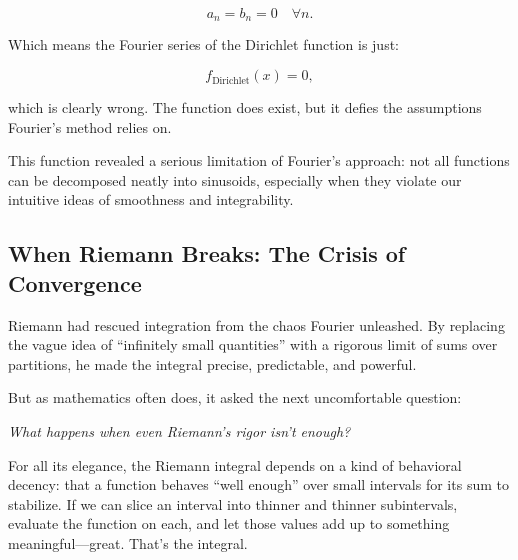 \[
a_n = b_n = 0 \quad \forall n.
\]

Which means the Fourier series of the Dirichlet function is just:

\[
f_{\text{Dirichlet}}(x) = 0,
\]

which is clearly wrong. The function does exist, but it defies the assumptions Fourier’s method relies on.

\begin{center}
\end{center}

\bigskip

This function revealed a serious limitation of Fourier’s approach: not all functions can be decomposed neatly into sinusoids, especially when they violate our intuitive ideas of smoothness and integrability.


\subsection{When Riemann Breaks: The Crisis of Convergence}

Riemann had rescued integration from the chaos Fourier unleashed. By replacing the vague idea of “infinitely small quantities” with a rigorous limit of sums over partitions, he made the integral precise, predictable, and powerful.

But as mathematics often does, it asked the next uncomfortable question:

\begin{center}
\emph{What happens when even Riemann's rigor isn't enough?}
\end{center}

For all its elegance, the Riemann integral depends on a kind of behavioral decency: that a function behaves “well enough” over small intervals for its sum to stabilize. If we can slice an interval into thinner and thinner subintervals, evaluate the function on each, and let those values add up to something meaningful—great. That’s the integral.

